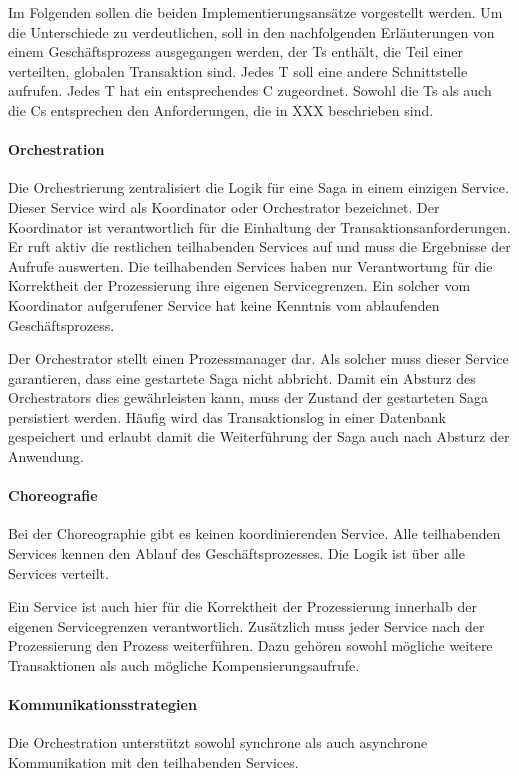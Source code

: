 Im Folgenden sollen die beiden Implementierungsansätze vorgestellt werden. Um die Unterschiede zu verdeutlichen, soll in den nachfolgenden Erläuterungen von einem Geschäftsprozess ausgegangen werden, der Ts enthält, die Teil einer verteilten, globalen Transaktion sind. Jedes T soll eine andere Schnittstelle aufrufen. Jedes T hat ein entsprechendes C zugeordnet. Sowohl die Ts als auch die Cs entsprechen den Anforderungen, die in XXX beschrieben sind. %

\paragraph{Orchestration}
Die Orchestrierung zentralisiert die Logik für eine Saga in einem einzigen Service. Dieser Service wird als Koordinator oder Orchestrator bezeichnet. Der Koordinator ist verantwortlich für die Einhaltung der Transaktionsanforderungen. Er ruft aktiv die restlichen teilhabenden Services auf und muss die Ergebnisse der Aufrufe auswerten. Die teilhabenden Services haben nur Verantwortung für die Korrektheit der Prozessierung ihre eigenen Servicegrenzen. Ein solcher vom Koordinator aufgerufener Service hat keine Kenntnis vom ablaufenden Geschäftsprozess. 

Der Orchestrator stellt einen Prozessmanager dar. Als solcher muss dieser Service garantieren, dass eine gestartete Saga nicht abbricht. Damit ein Absturz des Orchestrators dies gewährleisten kann, muss der Zustand der gestarteten Saga persistiert werden. Häufig wird das Transaktionslog in einer Datenbank gespeichert und erlaubt damit die Weiterführung der Saga auch nach Absturz der Anwendung. 

\paragraph{Choreografie}
Bei der Choreographie gibt es keinen koordinierenden Service. Alle teilhabenden Services kennen den Ablauf des Geschäftsprozesses. Die Logik ist über alle Services verteilt. 

Ein Service ist auch hier für die Korrektheit der Prozessierung innerhalb der eigenen Servicegrenzen verantwortlich. Zusätzlich muss jeder Service nach der Prozessierung den Prozess weiterführen. Dazu gehören sowohl mögliche weitere Transaktionen als auch mögliche Kompensierungsaufrufe. 


\paragraph{Kommunikationsstrategien}
Die Orchestration unterstützt sowohl synchrone als auch asynchrone Kommunikation mit den teilhabenden Services. 

